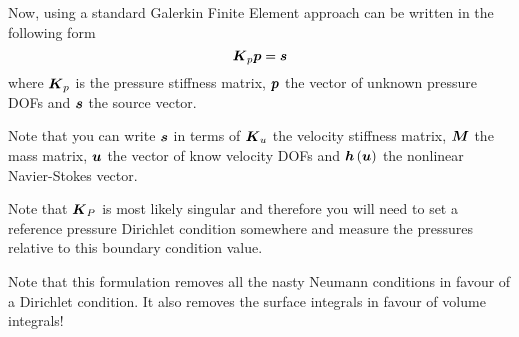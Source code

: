 Now, using a standard Galerkin Finite Element approach
 can be written in the following form
 \begin{equation}
   \matr{K}_{p}\vectr{p}=\vectr{s}
  \label{eqn:PressurePoissonFinalWeakForm}
\end{equation}
where $\matr{K}_{p}$ is the pressure stiffness matrix, $\boldsymbol{p}$ the vector of unknown
pressure DOFs and $\boldsymbol{s}$ the source vector. 

Note that you can write
$\boldsymbol{s}$ in terms of $\matr{K}_{u}$ the velocity
stiffness matrix, $\matr{M}$ the mass matrix, $\boldsymbol{u}$ the vector of know
velocity DOFs and $ \boldsymbol{h}\left( \boldsymbol{u} \right) $ the nonlinear Navier-Stokes
vector.

Note that $\matr{K}_{P}$ is most likely singular and therefore you will need to
set a reference pressure Dirichlet condition somewhere and measure the
pressures relative to this boundary condition value.

Note that this formulation removes all the nasty Neumann conditions in favour
of a Dirichlet condition. It also removes the surface integrals in favour of
volume integrals!

\newpage 
